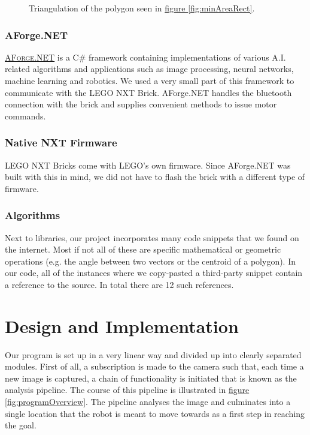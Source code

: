 \documentclass[10pt,twocolumn]{scrartcl}
\newcommand{\fref}[1]{\hyperref[#1]{figure \vref{#1}}}
\newcommand{\link}[2]{\textsc{\href{#1}{#2}}}
\begin{document}
\begin{figure}
	\centering
	
	\caption{\small Triangulation of the polygon seen in \fref{fig:minAreaRect}.}
	\label{fig:triangulatuon}
\end{figure}

\subsubsection{AForge.NET}
\link{http://www.aforgenet.com}{AForge.NET} is a C\# framework containing implementations of various A.I. related algorithms and applications such as image processing, neural networks, machine learning and robotics. We used a very small part of this framework to communicate with the LEGO NXT Brick. AForge.NET handles the bluetooth connection with the brick and supplies convenient methods to issue motor commands.

\subsubsection{Native NXT Firmware}
LEGO NXT Bricks come with LEGO's own firmware. Since AForge.NET was built with this in mind, we did not have to flash the brick with a different type of firmware.

\subsubsection{Algorithms}
Next to libraries, our project incorporates many code snippets that we found on the internet. Most if not all of these are specific mathematical or geometric operations (e.g. the angle between two vectors or the centroid of a polygon). In our code, all of the instances where we copy-pasted a third-party snippet contain a reference to the source. In total there are 12 such references.

\section{Design and Implementation}
Our program is set up in a very linear way and divided up into clearly separated modules. First of all, a subscription is made to the camera such that, each time a new image is captured, a chain of functionality is initiated that is known as the analysis pipeline. The course of this pipeline is illustrated in \fref{fig:programOverview}. The pipeline analyses the image and culminates into a single location that the robot is meant to move towards as a first step in reaching the goal.
\end{document}
